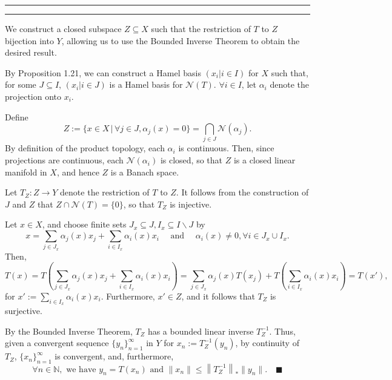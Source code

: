 \documentclass[11pt]{article}
\newcounter{questionCounter}
\newcounter{partCounter}[questionCounter]
\newenvironment{question}[2][\arabic{questionCounter}]{%
    \setcounter{partCounter}{0}%
    \vspace{.25in} \hrule \vspace{0.5em}%
        \noindent{\bf #2}%
    \vspace{0.8em} \hrule \vspace{.10in}%
    \addtocounter{questionCounter}{1}%
}{}
\newcommand{\mqed}{\quad \blacksquare}
\newcommand{\inv}{^{-1}}
\newcommand{\sminus}{\backslash}
\newcommand{\N}{\mathbb{N}} %
\newcommand{\Nul}{\mathcal{N}} %
\begin{document}
\begin{question}{Problem 8}
We construct a closed subspace $Z \subseteq X$ such that the restriction of $T$
to $Z$ bijection into $Y$, allowing us to use the Bounded Inverse Theorem to
obtain the desired result.

By Proposition 1.21, we can construct a Hamel basis $(x_i | i \in I)$ for $X$
such that, for some $J \subseteq I$, $(x_i | i \in J)$ is a Hamel basis for
$\Nul(T)$. $\forall i \in I$, let $\alpha_i$ denote the projection onto $x_i$.

Define
\[Z
    := \{x \in X \, | \, \forall j \in J, \alpha_j(x) = 0\}
    = \bigcap_{j \in J} \Nul(\alpha_j)
.\]
By definition of the product topology, each $\alpha_i$ is continuous. Then,
since projections are continuous, each $\Nul(\alpha_i)$ is closed, so that $Z$
is a closed linear manifold in $X$, and hence $Z$ is a Banach space.

Let $T_Z : Z \rightarrow Y$ denote the restriction of $T$ to $Z$. It follows
from the construction of $J$ and $Z$ that $Z \cap \Nul(T) = \{0\}$, so that
$T_Z$ is injective.

Let $x \in X$, and choose finite sets $J_x \subseteq J,
I_x \subseteq I \sminus J$ by
\[x = \sum_{j \in J_x} \alpha_j(x) x_j + \sum_{i \in I_x} \alpha_i(x) x_i
\quad \mbox{ and } \quad
\alpha_i(x) \neq 0, \forall i \in J_x \cup I_x.\]
Then,
\[T(x)
    = T\left( \sum_{j \in J_x} \alpha_j(x) x_j
    + \sum_{i \in I_x} \alpha_i(x) x_i \right)
    = \sum_{j \in J_x} \alpha_j(x) T(x_j)
    + T\left( \sum_{i \in I_x} \alpha_i(x) x_i \right)
    = T(x'),
\]
for $x' := \sum_{i \in I_x} \alpha_i(x) x_i$. Furthermore, $x' \in Z$, and it
follows that $T_Z$ is surjective.

By the Bounded Inverse Theorem, $T_Z$ has a bounded linear inverse $T_Z\inv$.
Thus, given a convergent sequence $\{y_n\}_{n = 1}^{\infty}$ in $Y$ for
$x_n := T_Z\inv(y_n)$, by continuity of $T_Z$,
$\{x_n\}_{n = 1}^{\infty}$ is convergent, and, furthermore,
\[\forall n \in \N, \mbox{ we have } y_n = T(x_n) \mbox{ and }
\|x_n\| \leq \left\| T_Z\inv \right\|_*\|y_n\|. \mqed\]
\end{question}
\end{document}
